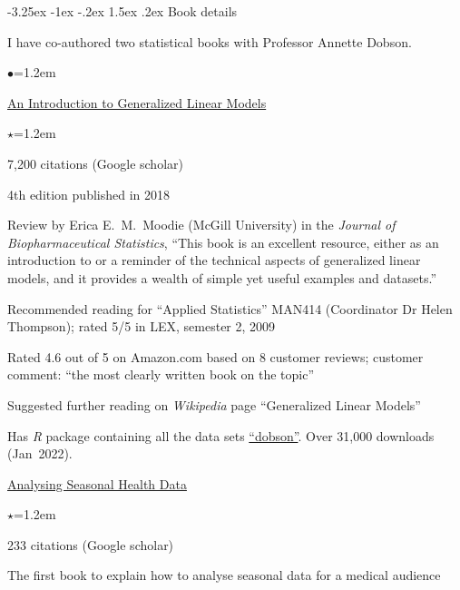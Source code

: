 \documentclass[a4paper,11pt]{article}
\makeatletter
\renewcommand\subsection{\@startsection{subsection}{2}{\z@}%
                                       {-3.25ex \@plus -1ex \@minus -.2ex}%
                                       {1.5ex \@plus .2ex}%
                                   {\normalfont\normalsize\bfseries\color{blue}}}
\renewcommand{\labelitemi}{$\bullet$}
\renewcommand{\labelitemii}{$\star$}
\makeatother
\begin{document}
\begin{raggedright}
\subsection{Book details}

I have co-authored two statistical books with Professor Annette Dobson.
\begin{list}{\labelitemi}{\leftmargin=1.2em}\addtolength{\itemsep}{-0.5\baselineskip}
\item \href{http://www.crcpress.com/product/isbn/9781584889502}{An Introduction to Generalized Linear Models}
\begin{list}{\labelitemii}{\leftmargin=1.2em}\addtolength{\itemsep}{-0.3\baselineskip}
\item 7,200 citations (Google scholar)
\item 4th edition published in 2018
\item Review by Erica E.\ M.\ Moodie (McGill University) in the \textit{Journal of Biopharmaceutical Statistics}, ``This book is an excellent resource, either as an introduction to or a reminder of the technical aspects of generalized linear models, and it provides a wealth of simple yet useful examples and datasets.''
\item Recommended reading for ``Applied Statistics'' MAN414 (Coordinator Dr Helen Thompson); rated 5/5 in LEX, semester 2, 2009
\item Rated 4.6 out of 5 on Amazon.com based on 8 customer reviews; customer comment: ``the most clearly written book on the topic''
\item Suggested further reading on \textit{Wikipedia} page ``Generalized Linear Models''
\item Has \textit{R} package containing all the data sets \href{http://cran.r-project.org/web/packages/dobson/index.html}{``dobson''}. Over 31,000 downloads (Jan~2022). %
\end{list}
\item \href{http://www.springer.com/statistics/stats+life+sci/book/978-3-642-10747-4}{Analysing Seasonal Health Data}
\begin{list}{\labelitemii}{\leftmargin=1.2em}\addtolength{\itemsep}{-0.3\baselineskip}
\item 233 citations (Google scholar)
\item The first book to explain how to analyse seasonal data for a medical audience

\end{list}
\end{list}
\end{raggedright}
\end{document}
